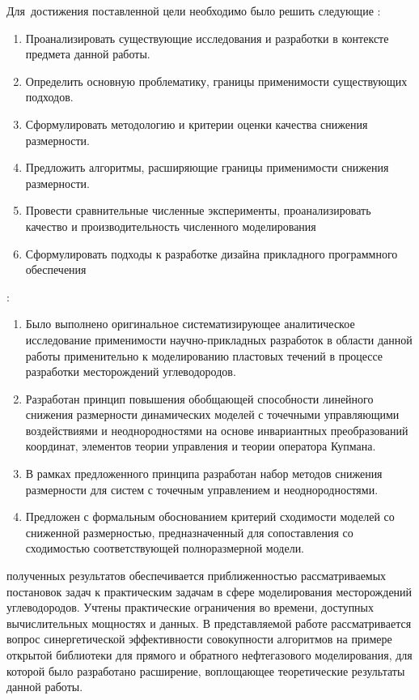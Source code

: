 Для~достижения поставленной цели необходимо было решить следующие {\tasks}:
\begin{enumerate}[beginpenalty=10000] %
  \item Проанализировать существующие исследования и разработки в контексте предмета данной работы.
  \item Определить основную проблематику, границы применимости существующих подходов.
  \item Сформулировать методологию и критерии оценки качества снижения размерности.
  \item Предложить алгоритмы, расширяющие границы применимости снижения размерности.
  \item Провести сравнительные численные эксперименты, проанализировать качество и производительность численного моделирования
  \item Сформулировать подходы к разработке дизайна прикладного программного обеспечения
\end{enumerate}

{\novelty}:
\begin{enumerate}[beginpenalty=10000] %
  \item Было выполнено оригинальное систематизирующее аналитическое исследование применимости научно-прикладных разработок в области данной работы применительно к моделированию пластовых течений в процессе разработки месторождений углеводородов.
  \item Разработан принцип повышения обобщающей способности линейного снижения размерности динамических моделей с точечными управляющими воздействиями и неоднородностями на основе инвариантных преобразований координат, элементов теории управления и теории оператора Купмана.
  \item В рамках предложенного принципа разработан набор методов снижения размерности для систем с точечным управлением и неоднородностями.
  \item Предложен с формальным обоснованием критерий сходимости моделей со сниженной размерностью, предназначенный для сопоставления со сходимостью соответствующей полноразмерной модели.
\end{enumerate}

{\influence} полученных результатов обеспечивается приближенностью рассматриваемых постановок задач к практическим задачам в сфере моделирования месторождений углеводородов. Учтены практические ограничения во времени, доступных вычислительных мощностях и данных. В представляемой работе рассматривается вопрос синергетической эффективности совокупности алгоритмов на примере открытой библиотеки для прямого и обратного нефтегазового моделирования, для которой было разработано расширение, воплощающее теоретические результаты данной работы.

